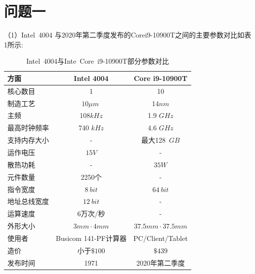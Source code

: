 \documentclass[12pt]{article}
\begin{document}
\section{问题一}
（1）Intel~4004 与2020年第二季度发布的Core\;i9-10900T之间的主要参数对比如表1所示:
	\begin{table}[h] 
		\centering
		\caption{Intel~4004与Inte~Core~i9-10900T部分参数对比}
		
		\begin{tabular}{|l|c|c|}\hline
			方面&Intel 4004&Core i9-10900T\\\hline
			核心数目 & 1 & 10 \\
			制造工艺  & $10 \mu m\;$ & 14$nm$\\
			主频 & 108$kHz$ & 1.9 $GHz$\\
			最高时钟频率 & 740 $kHz$  & 4.6  $GHz$\\
			支持内存大小&-&最大128~$GB$\\
			运作电压& $15V$ & - \\
			散热功耗 & - & $35W$ \\
			元件数量&2250个& - \\
			指令宽度&$8~bit$&$64~bit$\\
			地址总线宽度&$12~bit$&-\\
			运算速度 & 6万次/秒 & -\\
			外形大小 & $3mm\cdot 4mm$  & $37.5mm\cdot 37.5mm$\\ 
			使用者 & Busicom 141-PF计算器& PC/Client/Tablet\\
			造价 & 小于$\$100$& $\$439$\\
			发布时间&1971&2020年第二季度\\
			\hline
		\end{tabular}
		
		\label{table1}
	\end{table}
\end{document}
